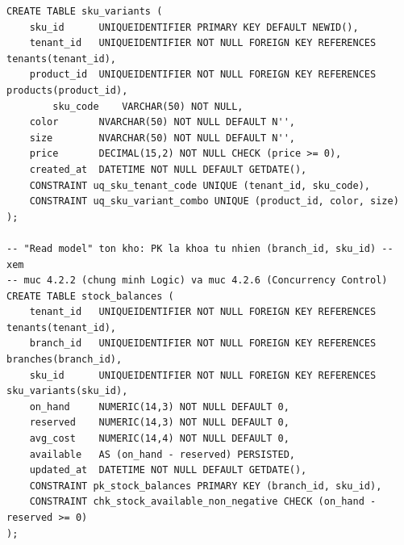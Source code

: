 \begin{lstlisting}
CREATE TABLE sku_variants (
    sku_id      UNIQUEIDENTIFIER PRIMARY KEY DEFAULT NEWID(),
    tenant_id   UNIQUEIDENTIFIER NOT NULL FOREIGN KEY REFERENCES tenants(tenant_id),
    product_id  UNIQUEIDENTIFIER NOT NULL FOREIGN KEY REFERENCES products(product_id),
        sku_code    VARCHAR(50) NOT NULL,
    color       NVARCHAR(50) NOT NULL DEFAULT N'',
    size        NVARCHAR(50) NOT NULL DEFAULT N'',
    price       DECIMAL(15,2) NOT NULL CHECK (price >= 0),
    created_at  DATETIME NOT NULL DEFAULT GETDATE(),
    CONSTRAINT uq_sku_tenant_code UNIQUE (tenant_id, sku_code),
    CONSTRAINT uq_sku_variant_combo UNIQUE (product_id, color, size)
);

-- "Read model" ton kho: PK la khoa tu nhien (branch_id, sku_id) -- xem
-- muc 4.2.2 (chung minh Logic) va muc 4.2.6 (Concurrency Control)
CREATE TABLE stock_balances (
    tenant_id   UNIQUEIDENTIFIER NOT NULL FOREIGN KEY REFERENCES tenants(tenant_id),
    branch_id   UNIQUEIDENTIFIER NOT NULL FOREIGN KEY REFERENCES branches(branch_id),
    sku_id      UNIQUEIDENTIFIER NOT NULL FOREIGN KEY REFERENCES sku_variants(sku_id),
    on_hand     NUMERIC(14,3) NOT NULL DEFAULT 0,
    reserved    NUMERIC(14,3) NOT NULL DEFAULT 0,
    avg_cost    NUMERIC(14,4) NOT NULL DEFAULT 0,
    available   AS (on_hand - reserved) PERSISTED,
    updated_at  DATETIME NOT NULL DEFAULT GETDATE(),
    CONSTRAINT pk_stock_balances PRIMARY KEY (branch_id, sku_id),
    CONSTRAINT chk_stock_available_non_negative CHECK (on_hand - reserved >= 0)
);
\end{lstlisting}


